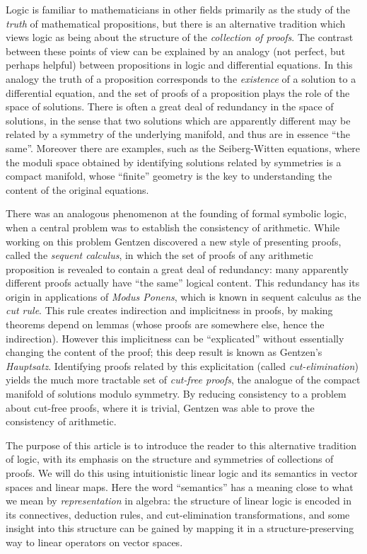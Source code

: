 \documentclass[english,letter paper,12pt,reqno]{article}
\theoremstyle{example}
\begin{document}
Logic is familiar to mathematicians in other fields primarily as the study of the \emph{truth} of mathematical propositions, but there is an alternative tradition which views logic as being about the structure of the \emph{collection of proofs}. The contrast between these points of view can be explained by an analogy (not perfect, but perhaps helpful) between propositions in logic and differential equations. In this analogy the truth of a proposition corresponds to the \emph{existence} of a solution to a differential equation, and the set of proofs of a proposition plays the role of the space of solutions. There is often a great deal of redundancy in the space of solutions, in the sense that two solutions which are apparently different may be related by a symmetry of the underlying manifold, and thus are in essence ``the same''. Moreover there are examples, such as the Seiberg-Witten equations, where the moduli space obtained by identifying solutions related by symmetries is a compact manifold, whose ``finite'' geometry is the key to understanding the content of the original equations.

There was an analogous phenomenon at the founding of formal symbolic logic, when a central problem was to establish the consistency of arithmetic. While working on this problem Gentzen discovered a new style of presenting proofs, called the \emph{sequent calculus}, in which the set of proofs of any arithmetic proposition is revealed to contain a great deal of redundancy: many apparently different proofs actually have ``the same'' logical content. This redundancy has its origin in applications of \emph{Modus Ponens}, which is known in sequent calculus as the \emph{cut rule}. This rule creates indirection and implicitness in proofs, by making theorems depend on lemmas (whose proofs are somewhere else, hence the indirection). However this implicitness can be ``explicated'' without essentially changing the content of the proof; this deep result is known as Gentzen's \emph{Hauptsatz}. Identifying proofs related by this explicitation (called \emph{cut-elimination}) yields the much more tractable set of \emph{cut-free proofs}, the analogue of the compact manifold of solutions modulo symmetry. By reducing consistency to a problem about cut-free proofs, where it is trivial, Gentzen was able to prove the consistency of arithmetic.

\vspace{0.3cm}

The purpose of this article is to introduce the reader to this alternative tradition of logic, with its emphasis on the structure and symmetries of collections of proofs. We will do this using intuitionistic linear logic and its semantics in vector spaces and linear maps. Here the word ``semantics'' has a meaning close to what we mean by \emph{representation} in algebra: the structure of linear logic is encoded in its connectives, deduction rules, and cut-elimination transformations, and some insight into this structure can be gained by mapping it in a structure-preserving way to linear operators on vector spaces.
\end{document}
